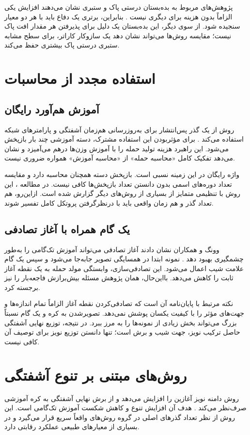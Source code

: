 پژوهش‌های مربوط به بده‌بستان درستی پاک و ستبری نشان می‌دهند افزایش یکی الزاماً بدون هزینه برای دیگری نیست \cite{tsipras2019robustness}. بنابراین، برتری یک دفاع باید با هر دو معیار سنجیده شود. از سوی دیگر، این بده‌بستان یک دلیل برای پذیرفتن هر مقدار افت پاک نیست؛ مقایسه روش‌ها می‌تواند نشان دهد یک سازوکار کاراتر، برای سطح مشابه ستبری درستی پاک بیشتری حفظ می‌کند.

\section{استفاده مجدد از محاسبات}
\subsection{آموزش هم‌آورد رایگان}
روش  از یک گذر پس‌انتشار برای به‌روزرسانی هم‌زمان آشفتگی و پارامترهای شبکه استفاده می‌کند \cite{shafahi2019adversarial}. برای مؤثربودن این استفاده مشترک، دسته آموزشی چند بار بازپخش می‌شود. این راهبرد هزینه تولید حمله را با آموزش وزن‌ها درهم می‌آمیزد و نشان می‌دهد تفکیک کامل «محاسبه حمله» از «محاسبه آموزش» همواره ضروری نیست.

واژه رایگان در این زمینه نسبی است. بازپخش دسته همچنان محاسبه دارد و مقایسه تعداد دوره‌های اسمی بدون دانستن تعداد بازپخش‌ها کافی نیست. در مطالعه \sora{}، این روش با تنظیمی متمایز از بسیاری از روش‌های دیگر گزارش شده است. ازاین‌رو، هم تعداد گذر و هم زمان واقعی باید با درنظرگرفتن پروتکل کامل تفسیر شوند.

\subsection{یک گام همراه با آغاز تصادفی}
وونگ و همکاران نشان دادند آغاز تصادفی می‌تواند آموزش تک‌گامی را به‌طور چشمگیری بهبود دهد \cite{wong2020fast}. نمونه ابتدا در همسایگی تصویر جابه‌جا می‌شود و سپس یک گام علامت شیب اعمال می‌شود. این تصادفی‌سازی، وابستگی مولد حمله به یک نقطه آغاز ثابت را کاهش می‌دهد. بااین‌حال، همان پژوهش مسئله بیش‌برازش فاجعه‌بار را نیز برجسته کرد.

نکته مرتبط با پایان‌نامه آن است که تصادفی‌کردن نقطه آغاز الزاماً تمام اندازه‌ها و جهت‌های مؤثر را با کیفیت یکسان پوشش نمی‌دهد. تصویرشدن به کره و یک گام نسبتاً بزرگ می‌تواند بخش زیادی از نمونه‌ها را به مرز ببرد. در نتیجه، توزیع نهایی آشفتگی حاصل ترکیب نویز، جهت شیب و برش است؛ تنها دانستن توزیع نویز برای توصیف آن کافی نیست.

\section{روش‌های مبتنی بر تنوع آشفتگی}
روش  دامنه نویز آغازین را افزایش می‌دهد و از برش نهایی آشفتگی به کره آموزشی صرف‌نظر می‌کند \cite{dejorge2022make}. هدف آن افزایش تنوع و کاهش شکست آموزش تک‌گامی است. این روش از نظر تعداد گذرهای اصلی در گروه روش‌های واقعاً سریع قرار می‌گیرد و در بسیاری از معیارهای طبیعی عملکرد رقابتی دارد.

